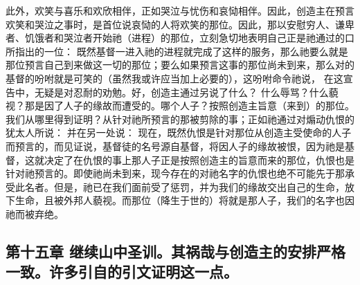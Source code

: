 此外，欢笑与喜乐和欢欣相伴，正如哭泣与忧伤和哀恸相伴。因此，创造主在预言欢笑和哭泣之事时，是首位说哀恸的人将欢笑的那位。因此，那以安慰穷人、谦卑者、饥饿者和哭泣者开始祂（进程）的那位，立刻急切地表明自己正是祂通过的口所指出的一位：              既然基督一进入祂的进程就完成了这样的服务，那么祂要么就是那位预言自己到来做这一切的那位；要么如果预言这事的那位尚未到来，那么对的基督的吩咐就是可笑的（虽然我或许应当加上必要的），这吩咐命令祂说，  在这宣告中，无疑是对忍耐的劝勉。好，创造主通过另说了什么？ 什么辱骂？什么藐视？那是因了人子的缘故而遭受的。哪个人子？按照创造主旨意（来到）的那位。我们从哪里得到证明？从针对祂所预言的那被剪除的事；正如祂通过对煽动仇恨的犹太人所说：  并在另一处说： 现在，既然仇恨是针对那位从创造主受使命的人子而预言的，而见证说，基督徒的名号源自基督，将因人子的缘故被恨，因为祂是基督，这就决定了在仇恨的事上那人子正是按照创造主的旨意而来的那位，仇恨也是针对祂预言的。即使祂尚未到来，现今存在的对祂名字的仇恨也绝不可能先于那承受此名者。但是，祂已在我们面前受了惩罚，并为我们的缘故交出自己的生命，放下生命，且被外邦人藐视。而那位（降生于世的）将就是那人子，我们的名字也因祂而被弃绝。\par


\subsection{第十五章 继续山中圣训。其祸哉与创造主的安排严格一致。许多引自的引文证明这一点。}

